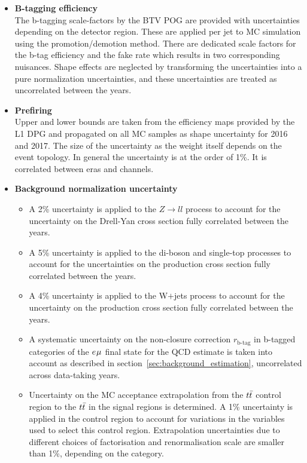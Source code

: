 \begin{itemize}
\item {\bf B-tagging efficiency} \\
The b-tagging scale-factors by the BTV POG are provided with uncertainties depending on the detector region. These are applied per jet to MC simulation using the promotion/demotion method.
There are dedicated scale factors for the b-tag efficiency and the fake rate which results in two corresponding nuisances. Shape effects are neglected by transforming the uncertainties into a pure
normalization uncertainties, and these uncertainties are treated as uncorrelated between the years.

\item {\bf Prefiring} \\
Upper and lower bounds are taken from the efficiency maps provided by the L1 DPG and propagated on all MC samples as shape uncertainty for 2016 and 2017.
The size of the uncertainty as the weight itself depends on the event topology. In general the uncertainty is at the order of 1\%.
It is correlated between eras and channels.

\item {\bf Background normalization uncertainty} \\
\begin{itemize}
\item
A 2\% uncertainty is applied to the $Z\rightarrow ll$ process to account for the uncertainty on the Drell-Yan cross section fully correlated between the years.
\item
A 5\% uncertainty is applied to the di-boson and single-top processes to account for the uncertainties on the production cross section fully correlated between the years.
\item
A 4\% uncertainty is applied to the W$+$jets process to account for the uncertainty on the production cross section fully correlated between the years.
\item
A systematic uncertainty on the non-closure correction $r_\text{b-tag}$ in b-tagged categories of
the $e_{}\mu_{}$ final state for the QCD estimate is taken into account as described
in section~\ref{sec:background_estimation}, uncorrelated across data-taking years.
\item
Uncertainty on the MC acceptance extrapolation from the $t\bar{t}$ control region to the $t\bar{t}$ in the signal regions is determined. A 1\% uncertainty
is applied in the control region to account for variations in the variables used to select
this control region. Extrapolation uncertainties due to different choices of factorisation and renormalisation scale
are smaller than 1\%, depending on the category.


\end{itemize}
\end{itemize}
